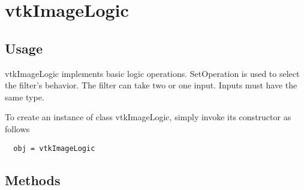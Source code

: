 \section{vtkImageLogic}

\subsection{Usage}

 vtkImageLogic implements basic logic operations.
 SetOperation is used to select the filter's behavior.
 The filter can take two or one input. Inputs must have the same type.

To create an instance of class vtkImageLogic, simply
invoke its constructor as follows
\begin{verbatim}
  obj = vtkImageLogic
\end{verbatim}
\subsection{Methods}

